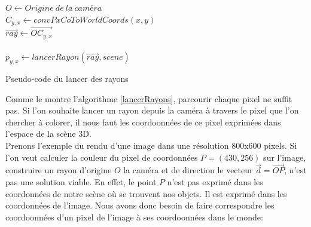 \documentclass[11pt]{article}
\begin{document}
\begin {algorithm}[H]
	\DontPrintSemicolon

	$O \gets Origine\ de\ la\ caméra$\\
	{
		{
			$C_{y, x} \gets convPxCoToWorldCoords(x, y)$\\
			$\overrightarrow{ray} \gets \overrightarrow{OC_{y,x}}$\\
			\hfill\\
			$p_{y, x} \gets lancerRayon(\overrightarrow{ray}, scene)$
		}
	}

	\caption{Pseudo-code du lancer des rayons}
	\label{lancerRayons}
\end {algorithm}

Comme le montre l'algorithme \ref{lancerRayons}, parcourir chaque pixel ne suffit pas. Si l'on souhaite lancer un rayon depuis la caméra à travers le pixel que l'on chercher à colorer, il nous faut les coordoonnées de ce pixel exprimées dans l'espace de la scène 3D.\\
Prenons l'exemple du rendu d'une image dans une résolution 800x600 pixels. Si l'on veut calculer la couleur du pixel de coordonnées $P = (430, 256)$ sur l'image, construire un rayon d'origine $O$ la caméra et de direction le vecteur $\overrightarrow{d} = \overrightarrow{OP}$, n'est pas une solution viable. En effet, le point $P$ n'est pas exprimé dans les coordonnées de notre scène où se trouvent nos objets. Il est exprimé dans les coordonnées de l'image. Nous avons donc besoin de faire correspondre les coordoonnées d'un pixel de l'image à ses coordoonnées dans le monde:
\end{document}
